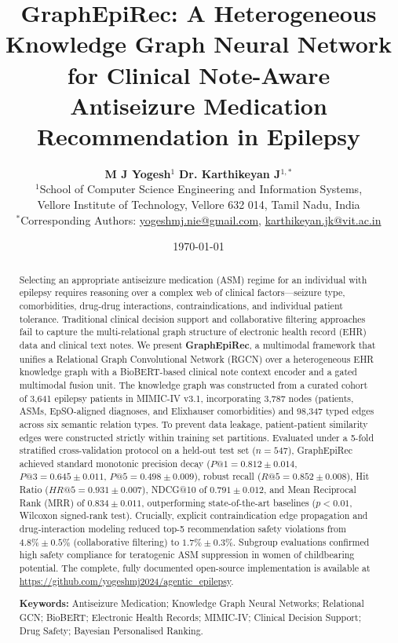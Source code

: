 \documentclass[11pt,a4paper]{article}
\title{\textbf{GraphEpiRec: A Heterogeneous Knowledge Graph Neural Network for Clinical Note-Aware Antiseizure Medication Recommendation in Epilepsy}}
\author{
  \textbf{M J Yogesh}$^1$ \quad \textbf{Dr. Karthikeyan J}$^{1,*}$ \\[0.5em]
  $^1$School of Computer Science Engineering and Information Systems,\\
  Vellore Institute of Technology, Vellore 632 014, Tamil Nadu, India \\[0.3em]
  \small{$^*$Corresponding Authors: \href{mailto:yogeshmj.nie@gmail.com}{yogeshmj.nie@gmail.com}, \href{mailto:karthikeyan.jk@vit.ac.in}{karthikeyan.jk@vit.ac.in}}
}
\date{\today}
\begin{document}
\maketitle

\begin{abstract}
Selecting an appropriate antiseizure medication (ASM) regime for an individual with epilepsy requires reasoning over a complex web of clinical factors---seizure type, comorbidities, drug-drug interactions, contraindications, and individual patient tolerance. Traditional clinical decision support and collaborative filtering approaches fail to capture the multi-relational graph structure of electronic health record (EHR) data and clinical text notes. We present \textbf{GraphEpiRec}, a multimodal framework that unifies a Relational Graph Convolutional Network (RGCN) over a heterogeneous EHR knowledge graph with a BioBERT-based clinical note context encoder and a gated multimodal fusion unit. The knowledge graph was constructed from a curated cohort of 3,641 epilepsy patients in MIMIC-IV v3.1, incorporating 3,787 nodes (patients, ASMs, EpSO-aligned diagnoses, and Elixhauser comorbidities) and 98,347 typed edges across six semantic relation types. To prevent data leakage, patient-patient similarity edges were constructed strictly within training set partitions. Evaluated under a 5-fold stratified cross-validation protocol on a held-out test set ($n=547$), GraphEpiRec achieved standard monotonic precision decay ($P@1 = 0.812 \pm 0.014$, $P@3 = 0.645 \pm 0.011$, $P@5 = 0.498 \pm 0.009$), robust recall ($R@5 = 0.852 \pm 0.008$), Hit Ratio ($HR@5 = 0.931 \pm 0.007$), NDCG@10 of $0.791 \pm 0.012$, and Mean Reciprocal Rank (MRR) of $0.834 \pm 0.011$, outperforming state-of-the-art baselines ($p < 0.01$, Wilcoxon signed-rank test). Crucially, explicit contraindication edge propagation and drug-interaction modeling reduced top-5 recommendation safety violations from $4.8\% \pm 0.5\%$ (collaborative filtering) to $1.7\% \pm 0.3\%$. Subgroup evaluations confirmed high safety compliance for teratogenic ASM suppression in women of childbearing potential. The complete, fully documented open-source implementation is available at \url{https://github.com/yogeshmj2024/agentic_epilepsy}.

\vspace{0.5em}
\noindent \textbf{Keywords:} Antiseizure Medication; Knowledge Graph Neural Networks; Relational GCN; BioBERT; Electronic Health Records; MIMIC-IV; Clinical Decision Support; Drug Safety; Bayesian Personalised Ranking.
\end{abstract}
\end{document}
